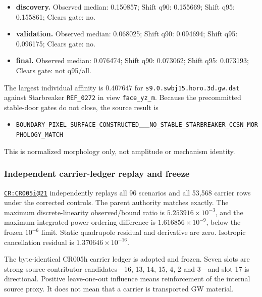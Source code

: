 \begin{itemize}
\tightlist
\item
  \textbf{discovery.} Observed median: 0.150857; Shift q90: 0.155669;
  Shift q95: 0.155861; Clears gate: no.
\item
  \textbf{validation.} Observed median: 0.068025; Shift q90: 0.094694;
  Shift q95: 0.096175; Clears gate: no.
\item
  \textbf{final.} Observed median: 0.076474; Shift q90: 0.073062; Shift
  q95: 0.073193; Clears gate: not q95/all.
\end{itemize}

The largest individual affinity is 0.407647 for
\nolinkurl{s9.0.swbj15.horo.3d.gw.dat} against Starbreaker
\texttt{REF\_0272} in view \texttt{face\_yz\_m}. Because the
precommitted stable-door gates do not close, the source result is

\begin{itemize}
\tightlist
\item
  \nolinkurl{BOUNDARY_PIXEL_SURFACE_CONSTRUCTED}\_\_\nolinkurl{NO_STABLE_STARBREAKER_CCSN_MORPHOLOGY_MATCH}
\end{itemize}

This is normalized morphology only, not amplitude or mechanism identity.

\subsubsection{Independent carrier-ledger replay and
freeze}\label{viii-ch08-independent-carrier-ledger-replay-and-freeze}

\href{https://github.com/iwtbotiwtwot/SAMA/blob/4c2b5dc1649da5900c90b90d0ce56c223dbb7717/tests/courtroom/21-gravitational-waves-cr005i-starbreaker-per-carrier-gw-control-appeal-and-freeze/README.md}{\texttt{CR:CR005i@21}}
independently replays all 96 scenarios and all 53,568 carrier rows under
the corrected controls. The parent authority matches exactly. The
maximum discrete-linearity observed/bound ratio is
\(5.253916\times10^{-3}\), and the maximum integrated-power ordering
difference is \(1.616856\times10^{-9}\), below the frozen \(10^{-6}\)
limit. Static quadrupole residual and derivative are zero. Isotropic
cancellation residual is \(1.370646\times10^{-16}\).

The byte-identical CR005h carrier ledger is adopted and frozen. Seven
slots are strong source-contributor candidates---16, 13, 14, 15, 4, 2
and 3---and slot 17 is directional. Positive leave-one-out influence
means reinforcement of the internal source proxy. It does not mean that
a carrier is transported GW material.

